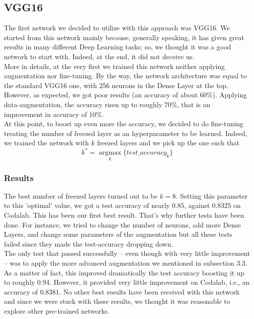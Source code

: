\documentclass[10pt]{article}
\begin{document}
\subsection{VGG16}
The first network we decided to utilize with this approach was VGG16. We started from this network mainly because, generally speaking, it has given great results in many different Deep Learning tasks; so, we thought it was a good network to start with. Indeed, at the end, it did not deceive us.\\[0.1cm] More in details, at the very first we trained this network neither applying augmentation nor fine-tuning. By the way, the network architecture was equal to the standard VGG16 one, with 256 neurons in the Dense Layer at the top. However, as expected, we got poor results (an accuracy of about $60\%$). Applying data-augmentation, the accuracy risen up to roughly $70\%$, that is an improvement in accuracy of $10\%$.\\[0.1cm]
At this point, to boost up even more the accuracy, we decided to do fine-tuning treating the number of freezed layer as an hyperparameter to be learned. Indeed, we trained the network with $k$ freezed layers and we pick up the one such that
\begin{equation*}
    k^* = \underset{k}{\operatorname{argmax}}\{test\_accuracy_{k}\}
\end{equation*}
\subsubsection{Results}
The best number of freezed layers turned out to be $k=8$. Setting this parameter to this 'optimal' value, we got a test accuracy of nearly $0.85$, against $0.8325$ on Codalab. This has been our first best result. That's why further tests have been done. For instance, we tried to change the number of neurons, add more Dense Layers, and change some parameters of the augmentation but all these tests failed since they made the test-accuracy dropping down.\\[0.1cm]
The only test that passed successfully -- even though with very little improvement -- was to apply the more advanced augmentation we mentioned in subsection 3.3. As a matter of fact, this improved dramatically the test accuracy boosting it up to roughly 0.94. However, it provided very little improvement on Codalab, i.e., an accuracy of 0.8381. No other best results have been received with this network and since we were stuck with these results, we thought it was reasonable to explore other pre-trained networks.
\end{document}
